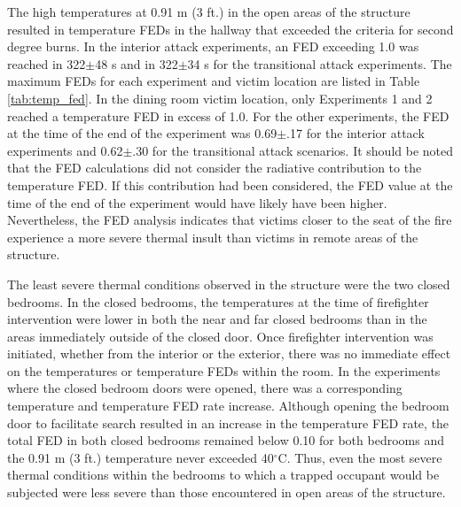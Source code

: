 \documentclass[12pt,oneside]{article}
\begin{document}
The high temperatures at 0.91 m (3 ft.) in the open areas of the structure resulted in temperature FEDs in the hallway that exceeded the criteria for second degree burns. In the interior attack experiments, an FED exceeding 1.0 was reached in 322$\pm$48 s and in 322$\pm$34 s for the transitional attack experiments.  The maximum FEDs for each experiment and victim location are listed in Table \ref{tab:temp_fed}. In the dining room victim location, only Experiments 1 and 2 reached a temperature FED in excess of 1.0. For the other experiments, the FED at the time of the end of the experiment was 0.69$\pm$.17 for the interior attack experiments and 0.62$\pm$.30 for the transitional attack scenarios. It should be noted that the FED calculations did not consider the radiative contribution to the temperature FED. If this contribution had been considered, the FED value at the time of the end of the experiment would have likely have been higher. Nevertheless, the FED analysis indicates that victims closer to the seat of the fire experience a more severe thermal insult than victims in remote areas of the structure.

The least severe thermal conditions observed in the structure were the two closed bedrooms. In the closed bedrooms, the temperatures at the time of firefighter intervention were lower in both the near and far closed bedrooms than in the areas immediately outside of the closed door. Once firefighter intervention was initiated, whether from the interior or the exterior, there was no immediate effect on the temperatures or temperature FEDs within the room. In the experiments where the closed bedroom doors were opened, there was a corresponding temperature and temperature FED rate increase. Although opening the bedroom door to facilitate search resulted in an increase in the temperature FED rate, the total FED in both closed bedrooms remained below 0.10 for both bedrooms and the 0.91 m (3 ft.) temperature never exceeded 40$^{\circ}$C. Thus, even the most severe thermal conditions within the bedrooms to which a trapped occupant would be subjected were less severe than those encountered in open areas of the structure. 
\end{document}
